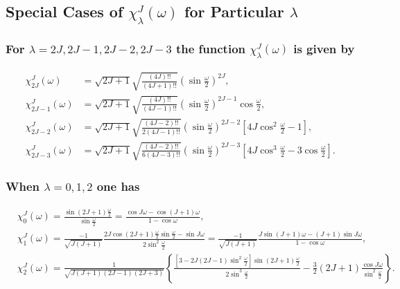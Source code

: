 \subsection{Special Cases of $\chi_{\lambda}^{J}(\omega)$ for Particular $\lambda$}\label{sec:4.15.8}
\subsubsection{ For $\lambda=2 J, 2 J-1,2 J-2,2 J-3$ the function $\chi_{\lambda}^{J}(\omega)$ is given by}
\begin{align}
\chi_{2 J}^{J}(\omega) & =\sqrt{2 J+1} \sqrt{\frac{(4 J)!!}{(4 J+1)!!}}\left(\sin \frac{\omega}{2}\right)^{2 J} , \label{eq:4:15:45}\\
\chi_{2 J-1}^{J}(\omega) & =\sqrt{2 J+1} \sqrt{\frac{(4 J)!!}{(4 J-1)!!}}\left(\sin \frac{\omega}{2}\right)^{2 J-1} \cos \frac{\omega}{2},  \label{eq:4:15:46}\\
\chi_{2 J-2}^{J}(\omega) & =\sqrt{2 J+1} \sqrt{\frac{(4 J-2)!!}{2(4 J-1)!!}}\left(\sin \frac{\omega}{2}\right)^{2 J-2}\left[4 J \cos ^{2} \frac{\omega}{2}-1\right] , \label{eq:4:15:47}\\
\chi_{2 J-3}^{J}(\omega) & =\sqrt{2 J+1} \sqrt{\frac{(4 J-2)!!}{6(4 J-3)!!}}\left(\sin \frac{\omega}{2}\right)^{2 J-3}\left[4 J \cos ^{3} \frac{\omega}{2}-3 \cos \frac{\omega}{2}\right] .\label{eq:4:15:48}
\end{align}
\subsubsection{ When $\lambda=0,1,2$ one has}
\begin{align}
& \chi_{0}^{J}(\omega)=\frac{\sin (2 J+1) \frac{\omega}{2}}{\sin \frac{\omega}{2}}=\frac{\cos J \omega-\cos (J+1) \omega}{1-\cos \omega} , \label{eq:4:15:49}\\
& \chi_{1}^{J}(\omega)=\frac{-1}{\sqrt{J(J+1)}} \frac{2 J \cos (2 J+1) \frac{\omega}{2} \sin \frac{\omega}{2}-\sin J \omega}{2 \sin ^{2} \frac{\omega}{2}}=\frac{-1}{\sqrt{J(J+1)}} \frac{J \sin (J+1) \omega-(J+1) \sin J \omega}{1-\cos \omega} , \label{eq:4:15:50}\\
& \chi_{2}^{J}(\omega)=\frac{1}{\sqrt{J(J+1)(2 J-1)(2 J+3)}}\left\{\frac{\left[3-2 J(2 J-1) \sin ^{2} \frac{\omega}{2}\right] \sin (2 J+1) \frac{\omega}{2}}{2 \sin ^{3} \frac{\omega}{2}}-\frac{3}{2}(2 J+1) \frac{\cos J \omega}{\sin ^{2} \frac{\omega}{2}}\right\} .\label{eq:4:15:51}
\end{align}
